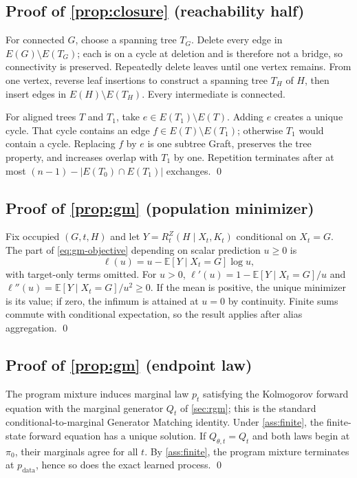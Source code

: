 \documentclass{article}
\newcommand{\pdata}{p_{\mathrm{data}}}
\newcommand{\pzero}{\pi_0}
\newcommand{\E}{\mathbb{E}}
\theoremstyle{definition}
\theoremstyle{remark}
\begin{document}
\subsection{Proof of \cref{prop:closure} (reachability half)}

For connected $G$, choose a spanning tree $T_G$. Delete every edge in $E(G)\setminus E(T_G)$; each is on a cycle at deletion and is therefore not a bridge, so connectivity is preserved. Repeatedly delete leaves until one vertex remains. From one vertex, reverse leaf insertions to construct a spanning tree $T_H$ of $H$, then insert edges in $E(H)\setminus E(T_H)$. Every intermediate is connected.

For aligned trees $T$ and $T_1$, take $e\in E(T_1)\setminus E(T)$. Adding $e$ creates a unique cycle. That cycle contains an edge $f\in E(T)\setminus E(T_1)$; otherwise $T_1$ would contain a cycle. Replacing $f$ by $e$ is one subtree Graft, preserves the tree property, and increases overlap with $T_1$ by one. Repetition terminates after at most $(n-1)-|E(T_0)\cap E(T_1)|$ exchanges. \qed

\subsection{Proof of \cref{prop:gm} (population minimizer)}

Fix occupied $(G,t,H)$ and let $Y=R_t^Z(H\mid X_t,K_t)$ conditional on $X_t=G$. The part of \eqref{eq:gm-objective} depending on scalar prediction $u\ge0$ is
\begin{equation}
\ell(u)=u-\E[Y\mid X_t=G]\log u,
\end{equation}
with target-only terms omitted. For $u>0$, $\ell'(u)=1-\E[Y\mid X_t=G]/u$ and $\ell''(u)=\E[Y\mid X_t=G]/u^2\ge0$. If the mean is positive, the unique minimizer is its value; if zero, the infimum is attained at $u=0$ by continuity. Finite sums commute with conditional expectation, so the result applies after alias aggregation. \qed

\subsection{Proof of \cref{prop:gm} (endpoint law)}

The program mixture induces marginal law $p_t$ satisfying the Kolmogorov forward equation with the marginal generator $Q_t$ of \cref{sec:rgm}; this is the standard conditional-to-marginal Generator Matching identity. Under \cref{ass:finite}, the finite-state forward equation has a unique solution. If $Q_{\theta,t}=Q_t$ and both laws begin at $\pzero$, their marginals agree for all $t$. By \cref{ass:finite}, the program mixture terminates at $\pdata$, hence so does the exact learned process. \qed
\end{document}
